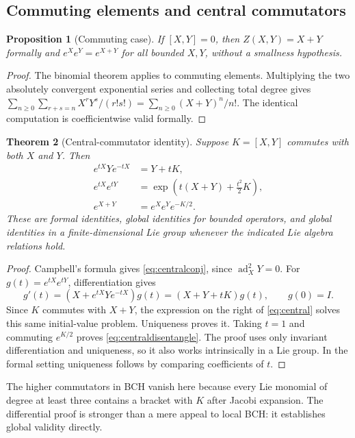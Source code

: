 \documentclass[11pt]{article}
\newtheorem{theorem}{Theorem}[section]
\newtheorem{proposition}[theorem]{Proposition}
\theoremstyle{definition}
\theoremstyle{remark}
\newcommand{\ad}{\operatorname{ad}}
\numberwithin{equation}{section}
\begin{document}
\subsection{Commuting elements and central commutators}
\begin{proposition}[Commuting case]\label{prop:commuting}
If $[X,Y]=0$, then $Z(X,Y)=X+Y$ formally and $e^Xe^Y=e^{X+Y}$ for all bounded $X,Y$, without a smallness hypothesis.
\end{proposition}
\begin{proof}
The binomial theorem applies to commuting elements. Multiplying the two absolutely convergent exponential series and collecting total degree gives
$\sum_{n\geq0}\sum_{r+s=n}X^rY^s/(r!s!)=\sum_{n\geq0}(X+Y)^n/n!$.
The identical computation is coefficientwise valid formally.
\end{proof}
\begin{theorem}[Central-commutator identity]\label{thm:central}
Suppose $K=[X,Y]$ commutes with both $X$ and $Y$. Then
\begin{align}
 e^{tX}Ye^{-tX}&=Y+tK,\label{eq:centralconj}\\
 e^{tX}e^{tY}&=\exp\!\left(t(X+Y)+\frac{t^2}{2}K\right),\label{eq:central}\\
 e^{X+Y}&=e^Xe^Ye^{-K/2}.\label{eq:centraldisentangle}
\end{align}
These are formal identities, global identities for bounded operators, and global identities in a finite-dimensional Lie group whenever the indicated Lie algebra relations hold.
\end{theorem}
\begin{proof}
Campbell's formula gives \eqref{eq:centralconj}, since $\ad_X^2Y=0$. For $g(t)=e^{tX}e^{tY}$, differentiation gives
\[
 g'(t)=(X+e^{tX}Ye^{-tX})g(t)=(X+Y+tK)g(t),\qquad g(0)=I.
\]
Since $K$ commutes with $X+Y$, the expression on the right of \eqref{eq:central} solves this same initial-value problem. Uniqueness proves it. Taking $t=1$ and commuting $e^{K/2}$ proves \eqref{eq:centraldisentangle}. The proof uses only invariant differentiation and uniqueness, so it also works intrinsically in a Lie group. In the formal setting uniqueness follows by comparing coefficients of $t$.
\end{proof}
The higher commutators in BCH vanish here because every Lie monomial of degree at least three contains a bracket with $K$ after Jacobi expansion. The differential proof is stronger than a mere appeal to local BCH: it establishes global validity directly.
\end{document}
